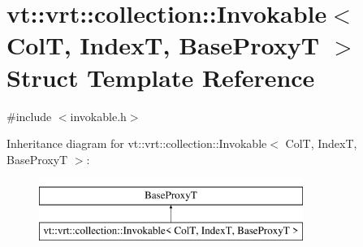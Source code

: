 \hypertarget{structvt_1_1vrt_1_1collection_1_1_invokable}{}\section{vt\+:\+:vrt\+:\+:collection\+:\+:Invokable$<$ ColT, IndexT, Base\+ProxyT $>$ Struct Template Reference}
\label{structvt_1_1vrt_1_1collection_1_1_invokable}


{\ttfamily \#include $<$invokable.\+h$>$}

Inheritance diagram for vt\+:\+:vrt\+:\+:collection\+:\+:Invokable$<$ ColT, IndexT, Base\+ProxyT $>$\+:\begin{figure}[H]
\begin{center}
\leavevmode
\includegraphics[height=2.000000cm]{structvt_1_1vrt_1_1collection_1_1_invokable}
\end{center}
\end{figure}
